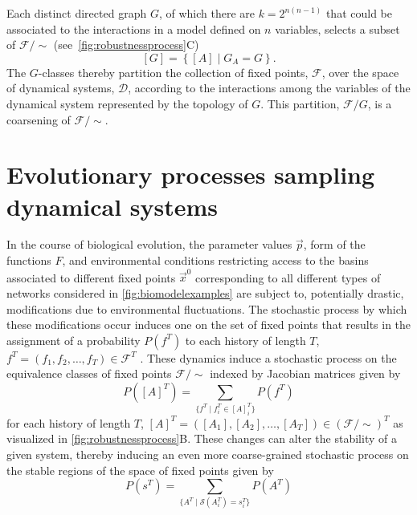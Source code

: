 Each distinct directed graph $G$, of which there are $k=2^{n(n-1)}$ that could be associated to the interactions in a model defined on $n$ variables, selects a subset of $\mathcal{F} / {\sim}$ (see~\ref{fig:robustnessprocess}C)
\begin{equation}\label{eq:jacgrapheqs}
[G] = \left\{ [A] \; | \; G_A = G \right\}.
\end{equation}
The $G$-classes thereby partition the collection of fixed points, $\mathcal{F}$, over the space of dynamical systems, $\mathcal{D}$, according to the interactions among the variables of the dynamical system represented by the topology of $G$. This partition, $\mathcal{F} / G$, is a coarsening of $\mathcal{F} / {\sim}$.

\section{Evolutionary processes sampling dynamical systems}
In the course of biological evolution, the parameter values $\vec{p}$, form of the functions $F$, and environmental conditions restricting access to the basins associated to different fixed points $\vec{x}^0$ corresponding to all different types of networks considered in \ref{fig:biomodelexamples} are subject to, potentially drastic, modifications due to environmental fluctuations. The stochastic process by which these modifications occur induces one on the set of fixed points that results in the assignment of a probability $P(f^T)$ to each history of length $T$, $f^T = ( f_1,f_2,\ldots,f_T ) \in \mathcal{F}^T$ \cite{RobertM.Gray130}.
These dynamics induce a stochastic process on the equivalence classes of fixed points $\mathcal{F}/{\sim}$ indexed by Jacobian matrices given by
$$
P([A]^T) = \sum_{ \{ f^T \mid f_i^T \in [A]_i^T \} } P(f^T)
$$
for each history of length $T$, $[A]^T = ( [A_1], [A_2], \ldots, [A_T] ) \in (\mathcal{F}/{\sim})^T$
as visualized in \ref{fig:robustnessprocess}B. These changes can alter the stability of a given system, thereby inducing an even more coarse-grained stochastic process on the stable regions of the space of fixed points given by
$$
P(s^T) = \sum_{ \{ A^T \mid \mathcal{S}(A_i^T) = s_i^T \} } P(A^T)
$$
